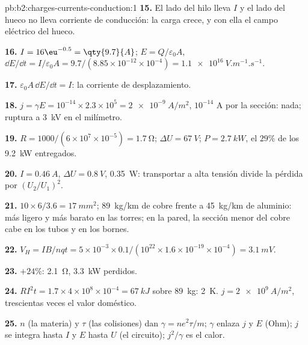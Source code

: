 \begin{solution}{pb:b2:charges-currents-conduction:1}
\textbf{15.} El lado del hilo lleva $I$ y el lado del hueco no lleva
corriente de conducción: la carga crece, y con ella el campo eléctrico del
hueco.

\textbf{16.} $I = 16\eu^{-0.5} = \qty{9.7}{A}$; $E = Q/\varepsilon_0A$, $\dd E/\dd t = I/\varepsilon_0A
= 9.7/(8.85 \times 10^{-12} \times 10^{-4}) = \qty{1.1e16}{V.m^{-1}.s^{-1}}$.

\textbf{17.} $\varepsilon_0A\,\dd E/\dd t = I$: la corriente de desplazamiento.

\textbf{18.} $j = \gamma E = 10^{-14} \times 2.3 \times 10^5 = \qty{2e-9}{A/m^2}$, $10^{-14}$ A
por la sección: nada; ruptura a \qty{3}{kV} en el milímetro.

\textbf{19.} $R = 1000/(6 \times 10^7 \times 10^{-5}) = \qty{1.7}{\ohm}$; $\Delta U = \qty{67}{V}$; $P =
\qty{2.7}{kW}$, el $29\%$ de los \qty{9.2}{kW} entregados.

\textbf{20.} $I = \qty{0.46}{A}$, $\Delta U = \qty{0.8}{V}$, \qty{0.35}{W}: transportar a
alta tensión divide la pérdida por $(U_2/U_1)^2$.

\textbf{21.} $10 \times 6/3.6 = \qty{17}{mm^2}$; \qty{89}{kg/km} de cobre frente a
\qty{45}{kg/km} de aluminio: más ligero y más barato en las torres; en la
pared, la sección menor del cobre cabe en los tubos y en los bornes.

\textbf{22.} $V_H = IB/nqt = 5 \times 10^{-3} \times 0.1/(10^{22} \times 1.6 \times 10^{-19} \times 10^{-4}) =
\qty{3.1}{mV}$.

\textbf{23.} $+24\%$: \qty{2.1}{\ohm}, \qty{3.3}{kW} perdidos.

\textbf{24.} $RI^2t = 1.7 \times 4 \times 10^8 \times 10^{-4} = \qty{67}{kJ}$ sobre \qty{89}{kg}: \qty{2}{K}.
$j = \qty{2e9}{A/m^2}$, trescientas veces el valor doméstico.

\textbf{25.} $n$ (la materia) y $\tau$ (las colisiones) dan $\gamma = ne^2\tau/m$;
$\gamma$ enlaza $j$ y $E$ (Ohm); $j$ se integra hasta $I$ y $E$ hasta $U$ (el
circuito); $j^2/\gamma$ es el calor.
\end{solution}
